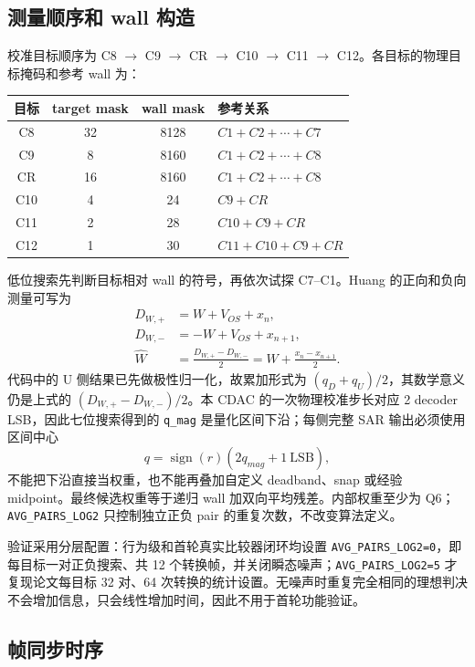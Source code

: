 \documentclass[UTF8,a4paper,11pt]{ctexart}
\newcommand{\code}[1]{\texttt{#1}}
\begin{document}
\subsection{测量顺序和 wall 构造}

校准目标顺序为 C8 $\rightarrow$ C9 $\rightarrow$ CR $\rightarrow$ C10 $\rightarrow$ C11 $\rightarrow$ C12。各目标的物理目标掩码和参考 wall 为：

\begin{table}[H]
\centering
\small
\begin{tabular}{cccl}
\toprule
目标 & target mask & wall mask & 参考关系 \\
\midrule
C8 & 32 & 8128 & $C1+C2+\cdots+C7$ \\
C9 & 8 & 8160 & $C1+C2+\cdots+C8$ \\
CR & 16 & 8160 & $C1+C2+\cdots+C8$ \\
C10 & 4 & 24 & $C9+CR$ \\
C11 & 2 & 28 & $C10+C9+CR$ \\
C12 & 1 & 30 & $C11+C10+C9+CR$ \\
\bottomrule
\end{tabular}
\end{table}

低位搜索先判断目标相对 wall 的符号，再依次试探 C7--C1。Huang 的正向和负向测量可写为
\begin{align}
D_{W,+} &= W + V_{OS} + x_n,\\
D_{W,-} &= -W + V_{OS} + x_{n+1},\\
\widehat W &= \frac{D_{W,+}-D_{W,-}}{2}
=W+\frac{x_n-x_{n+1}}{2}.
\end{align}
代码中的 U 侧结果已先做极性归一化，故累加形式为 $(q_D+q_U)/2$，其数学意义仍是上式的 $(D_{W,+}-D_{W,-})/2$。本 CDAC 的一次物理校准步长对应 2 decoder LSB，因此七位搜索得到的 \code{q\_mag} 是量化区间下沿；每侧完整 SAR 输出必须使用区间中心
\[
q=\operatorname{sign}(r)\left(2q_{mag}+1\ \mathrm{LSB}\right),
\]
不能把下沿直接当权重，也不能再叠加自定义 deadband、snap 或经验 midpoint。最终候选权重等于递归 wall 加双向平均残差。内部权重至少为 Q6；\code{AVG\_PAIRS\_LOG2} 只控制独立正负 pair 的重复次数，不改变算法定义。

验证采用分层配置：行为级和首轮真实比较器闭环均设置 \code{AVG\_PAIRS\_LOG2=0}，即每目标一对正负搜索、共 12 个转换帧，并关闭瞬态噪声；\code{AVG\_PAIRS\_LOG2=5} 才复现论文每目标 32 对、64 次转换的统计设置。无噪声时重复完全相同的理想判决不会增加信息，只会线性增加时间，因此不用于首轮功能验证。

\subsection{帧同步时序}
\end{document}
